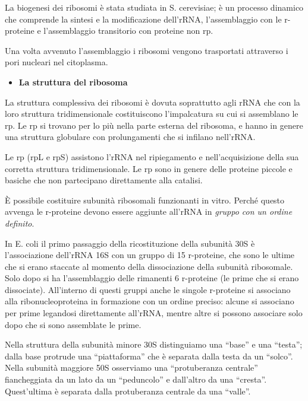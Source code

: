 \documentclass[11pt]{book}
\begin{document}
La biogenesi dei ribosomi è stata studiata in S. cerevisiae; è un
processo dinamico che comprende la sintesi e la modificazione dell'rRNA,
l'assemblaggio con le r-proteine e l'assemblaggio transitorio con
proteine non rp.

Una volta avvenuto l'assemblaggio i ribosomi vengono trasportati
attraverso i pori nucleari nel citoplasma.

\begin{itemize}
\itemsep1pt\parskip0pt
\item
  \textbf{La struttura del ribosoma}
\end{itemize}

La struttura complessiva dei ribosomi è dovuta soprattutto agli rRNA che
con la loro struttura tridimensionale costituiscono l'impalcatura su cui
si assemblano le rp. Le rp si trovano per lo più nella parte esterna del
ribosoma, e hanno in genere una struttura globulare con prolungamenti
che si infilano nell'rRNA.

Le rp (rpL e rpS) assistono l'rRNA nel ripiegamento e nell'acquisizione
della sua corretta struttura tridimensionale. Le rp sono in genere delle
proteine piccole e basiche che non partecipano direttamente alla
catalisi.

È possibile costituire subunità ribosomali funzionanti in vitro. Perché
questo avvenga le r-proteine devono essere aggiunte all'rRNA in
\emph{gruppo con un ordine definito}.

In E. coli il primo passaggio della ricostituzione della subunità 30S è
l'associazione dell'rRNA 16S con un gruppo di 15 r-proteine, che sono le
ultime che si erano staccate al momento della dissociazione della
subunità ribosomale. Solo dopo si ha l'assemblaggio delle rimanenti 6
r-proteine (le prime che si erano dissociate). All'interno di questi
gruppi anche le singole r-proteine si associano alla ribonucleoproteina
in formazione con un ordine preciso: alcune si associano per prime
legandosi direttamente all'rRNA, mentre altre si possono associare solo
dopo che si sono assemblate le prime.

Nella struttura della subunità minore 30S distinguiamo una ``base'' e
una ``testa''; dalla base protrude una ``piattaforma'' che è separata
dalla testa da un ``solco''. Nella subunità maggiore 50S osserviamo una
``protuberanza centrale'' fiancheggiata da un lato da un ``peduncolo'' e
dall'altro da una ``cresta''. Quest'ultima è separata dalla protuberanza
centrale da una ``valle''.
\end{document}
